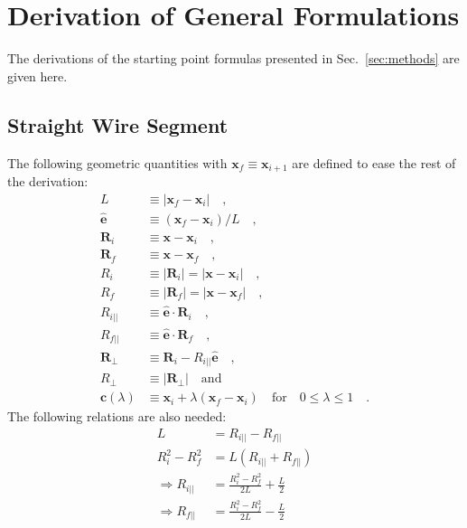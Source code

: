 \section{Derivation of General Formulations}
\label{apx:derivation_of_general_formulations}
The derivations of the starting point formulas presented in Sec.~\ref{sec:methods} are given here.

\subsection{Straight Wire Segment}
The following geometric quantities with $\mathbf{x}_f \equiv \mathbf{x}_{i+1}$ are defined to ease the rest of the derivation:
\begin{align}
 L                   & \equiv | \mathbf{x}_f - \mathbf{x}_i | \quad , \\
 \hat{\mathbf{e}}    & \equiv \left(\mathbf{x}_f - \mathbf{x}_i\right) / L \quad , \\
 \mathbf{R}_i        & \equiv \mathbf{x} - \mathbf{x}_i \quad , \\
 \mathbf{R}_f        & \equiv \mathbf{x} - \mathbf{x}_f \quad , \\
 R_i                 & \equiv | \mathbf{R}_i | = | \mathbf{x} - \mathbf{x}_i | \quad , \\
 R_f                 & \equiv | \mathbf{R}_f | = | \mathbf{x} - \mathbf{x}_f | \quad , \\
 R_{i ||}            & \equiv \hat{\mathbf{e}} \cdot \mathbf{R}_i \quad , \\
 R_{f ||}            & \equiv \hat{\mathbf{e}} \cdot \mathbf{R}_f \quad , \\
 \mathbf{R}_\perp    & \equiv \mathbf{R}_i - R_{i ||} \hat{\mathbf{e}} \quad , \\
 R_\perp             & \equiv | \mathbf{R}_\perp | \quad \mathrm{and} \\
 \mathbf{c}(\lambda) & \equiv \mathbf{x}_i + \lambda \left(\mathbf{x}_f - \mathbf{x}_i\right) \quad \mathrm{for} \quad 0 \leq \lambda \leq 1 \quad .
\end{align}
The following relations are also needed:
\begin{align}
       L             & = R_{i ||} - R_{f ||} \\
       R_i^2 - R_f^2 & = L \left( R_{i ||} + R_{f ||} \right) \\
\Rightarrow R_{i ||} & = \frac{R_i^2 - R_f^2}{2 L} + \frac{L}{2} \\
\Rightarrow R_{f ||} & = \frac{R_i^2 - R_f^2}{2 L} - \frac{L}{2}
\end{align}

